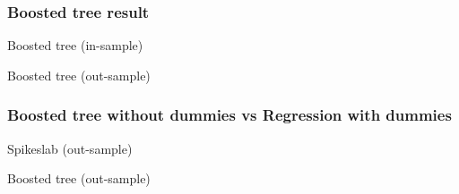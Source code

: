 \documentclass{beamer}
\begin{document}
\begin{frame}
\frametitle{Boosted tree result}
\begin{table}
	
	\caption{Boosted tree (in-sample)}
\end{table}
\begin{table}
	
	\caption{Boosted tree (out-sample)}
\end{table}
\end{frame}

\begin{frame}
\frametitle{Boosted tree without dummies vs Regression with dummies}
\begin{table}
	
	\caption{Spikeslab (out-sample)}
\end{table}
\begin{table}
	
	\caption{Boosted tree (out-sample)}
\end{table}
\end{frame}
\end{document}
